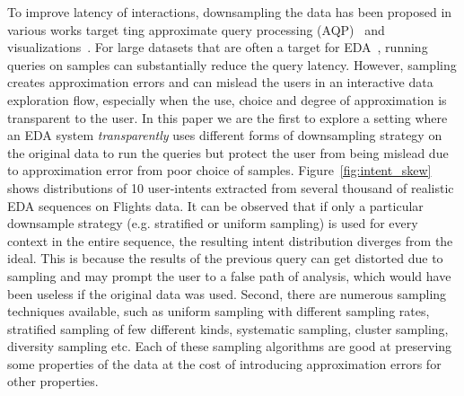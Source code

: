To improve latency of interactions, downsampling the data has been proposed in various works target ting approximate query processing (AQP)~\cite{chaudhuri2017approximate, park2018verdictdb, sheoran2022aaai} and visualizations~\cite{park2016visualization, moritz2017trust, porwal2022sigmod}. For large datasets that are often a target for EDA~\cite{galakatos2017revisiting, wang2014sample}, running queries on samples can substantially reduce the query latency.
However, sampling creates approximation errors and can mislead the users in an interactive data exploration flow, especially when the use, choice and degree of approximation is transparent to the user.
In this paper we are the first to explore a setting where an EDA system \textit{transparently} uses different forms of downsampling strategy on the original data to run the queries but protect the user from being mislead due to approximation error from poor choice of samples. 
%
Figure~\ref{fig:intent_skew} shows distributions of 10 user-intents extracted from several thousand of realistic EDA sequences on Flights data.
It can be observed that if only a particular downsample strategy (e.g. stratified or uniform sampling) is used for every context in the entire sequence, the resulting intent distribution diverges from the ideal. 
%
%
This is because the results of the previous query can get distorted due to sampling and may prompt the user to a false path of analysis, which would have been useless if the original data was used. Second, there are numerous sampling techniques available, such as uniform sampling with different sampling rates, stratified sampling of few different kinds, systematic sampling, cluster sampling, diversity sampling etc.
%
%
Each of these sampling algorithms are good at preserving some properties of the data at the cost of introducing approximation errors for other properties. 
